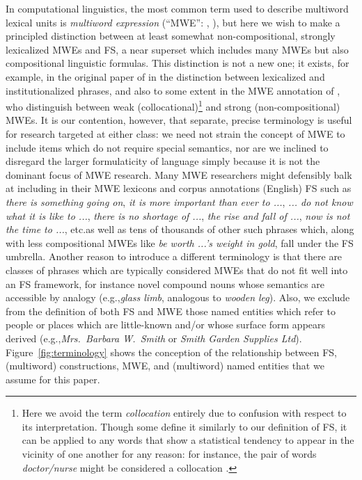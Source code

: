 \documentclass[11pt,letterpaper]{article}
\makeatletter
\def \eg {e.g.,\@ }
\def \etc {etc.\@ }
\newcommand{\dotts}{...\xspace}
\newcommand{\ex}[1]{\textit{#1}\xspace}
\newcommand{\figref}[2][]{Figure#1~\ref{#2}\xspace}
\makeatother
\begin{document}
In computational linguistics, the most common term used to describe multiword lexical units is \emph{multiword expression} (``MWE'': , ), but here we wish to make a principled distinction between at least somewhat non-compositional, strongly lexicalized MWEs and FS, a near superset which includes many MWEs but also compositional linguistic formulas. This distinction is not a new one; it exists, for example, in the original paper of  in the distinction between lexicalized and institutionalized phrases, and also to some extent in the MWE annotation of , who distinguish between weak (collocational)\footnote{Here we avoid the term \emph{collocation} entirely due to confusion with respect to its interpretation. Though some define it similarly to our definition of FS, it can be applied to any words that show a statistical tendency to appear in the vicinity of one another for any reason: for instance, the pair of words \ex{doctor/nurse} might be considered a collocation \cite{Ramisch14}.}  and strong (non-compositional) MWEs. It is our contention, however, that separate, precise terminology is useful for research targeted at either class: we need not strain the concept of MWE to include items which do not require special semantics, nor are we inclined to disregard the larger formulaticity of language simply because it is not the dominant focus of MWE research. Many MWE researchers might defensibly balk at including in their MWE lexicons and corpus annotations (English) FS such as \ex{there is something going on}, \ex{it is more important than ever to \dotts}, \ex{\dotts do not know what it is like to \dotts}, \ex{there is no shortage of \dotts}, \ex{the rise and fall of \dotts}, \ex{now is not the time to \dotts}, \etc as well as tens of thousands of other such phrases which, along with less compositional MWEs like \ex{be worth \dotts's weight in gold}, fall under the FS umbrella. Another reason to introduce a different terminology is that there are classes of phrases which are typically considered MWEs that do not fit well into an FS framework, for instance novel compound nouns whose semantics are accessible by analogy (\eg \ex{glass limb}, analogous to \ex{wooden leg}). Also, we exclude from the definition of both FS and MWE those named entities which refer to people or places which are little-known and/or whose surface form appears derived (\eg \ex{Mrs.\ Barbara W.\ Smith} or \ex{Smith Garden Supplies Ltd}). \figref{fig:terminology} shows the conception of the relationship between FS, (multiword) constructions, MWE, and (multiword) named entities that we assume for this paper.
\end{document}
